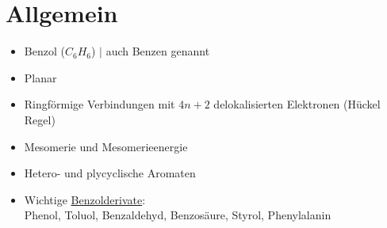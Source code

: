 \section{Allgemein}

\begin{multicols}{2}

\begin{itemize}
    \item Benzol ($C_6H_6$) $|$ auch Benzen genannt
    \item Planar
    \item Ringförmige Verbindungen mit $4n+2$ delokalisierten Elektronen (Hückel Regel)
    \item Mesomerie und Mesomerieenergie
    \item Hetero- und plycyclische Aromaten
    \item Wichtige \hyperref[sec:benzolderivate]{Benzolderivate}: \\
        Phenol, Toluol, Benzaldehyd, Benzosäure, Styrol, Phenylalanin
\end{itemize}

\end{multicols}
